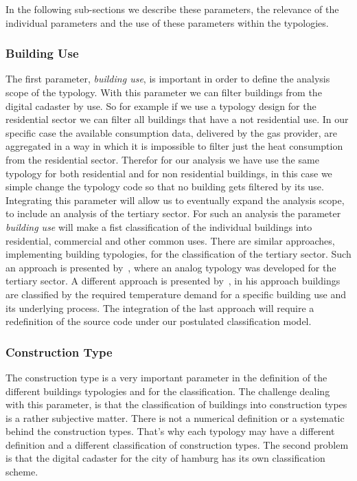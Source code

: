 In the following sub-sections we describe these parameters, the relevance of the
individual parameters and the use of these parameters within the typologies.\\

\subsubsection{Building Use}

The first parameter, \textit{building use}, is important in order to define the
analysis scope of the typology.  With this parameter we can filter buildings
from the digital cadaster by use. So for example if we use a typology design
for the residential sector we can filter all buildings that have a not
residential use. In our specific case the available consumption data, delivered
by the gas provider, are aggregated in a way in which it is impossible to
filter just the heat consumption from the residential sector.  Therefor for our
analysis we have use the same typology for both residential and for non
residential buildings, in this case we simple change the typology code so that
no building gets filtered by its use.\\

Integrating this parameter will allow us to eventually expand the analysis
scope, to include an analysis of the tertiary sector.  For such an analysis the
parameter \textit{building use} will make a fist classification of the
individual buildings into residential, commercial and other common uses. There
are similar approaches, implementing building typologies, for the
classification of the tertiary sector.  Such an approach is presented
by~\citet{Loga.2011}, where an analog typology was
developed for the tertiary sector.  A different approach is presented
by~\citet{Blesl.2007}, in his
approach buildings are classified by the required temperature demand for a
specific building use and its underlying process. The integration of the last
approach will require a redefinition of the source code under our postulated
classification model.\\

\subsubsection{Construction Type}\label{sub-sub-sec:Ctype}

The construction type is a very important parameter in the definition of the
different buildings typologies and for the classification.  The challenge
dealing with this parameter, is that the classification of buildings into
construction types is a rather subjective matter.  There is not a numerical
definition or a systematic behind the construction types.  That's why each
typology may have a different definition and a different classification of
construction types.  The second problem is that the digital cadaster for the
city of hamburg has its own classification scheme.\\

